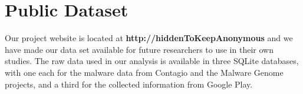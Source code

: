 \documentclass{sig-alternate}
\newif\ifisnopii
\begin{document}
























%


















\section{Public Dataset}
\label{sec:dataset}


Our project website is located at \textbf{\ifisnopii \url{http://darwin.rit.edu/amp/} \else http://hiddenToKeepAnonymous\fi} and we have made our data set available for future researchers to use in their own studies. The raw data used in our analysis is available in three SQLite databases, with one each for the malware data from Contagio and the Malware Genome projects, and a third for the collected information from Google Play.
\end{document}
